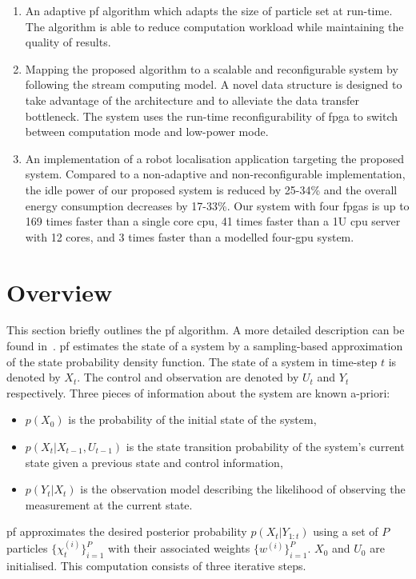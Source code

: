 \begin{enumerate}
\item An adaptive \gls{pf} algorithm which adapts the size of particle set at run-time. 
The algorithm is able to reduce computation workload while maintaining the quality of results.
\item Mapping the proposed algorithm to a scalable and reconfigurable system by following the stream computing model.
A novel data structure is designed to take advantage of the architecture and to alleviate the data transfer bottleneck.
The system uses the run-time reconfigurability of \gls{fpga} to switch between computation mode and low-power mode.
\item An implementation of a robot localisation application targeting the proposed system. 
Compared to a non-adaptive and non-reconfigurable implementation, the idle power of our proposed system is reduced by 25-34\% and the overall energy consumption decreases by 17-33\%.
Our system with four \gls{fpga}s is up to 169 times faster than a single core \gls{cpu}, 41 times faster than a 1U \gls{cpu} server with 12 cores, and 3 times faster than a modelled four-\gls{gpu} system.
\end{enumerate}

\section{Overview}

This section briefly outlines the \gls{pf} algorithm.
A more detailed description can be found in~\cite{doucet01}. 
\gls{pf} estimates the state of a system by a sampling-based approximation of the state probability density function. 
The state of a system in time-step $t$ is denoted by $X_t$. 
The control and observation are denoted by $U_t$ and $Y_t$ respectively. 
Three pieces of information about the system are known a-priori: 
\begin{itemize}
\item $p(X_0)$ is the probability of the initial state of the system, 
\item $p(X_t|X_{t-1},U_{t-1})$ is the state transition probability of the system's current state given a previous state and control information, 
\item $p(Y_t|X_t)$ is the observation model describing the likelihood of observing the measurement at the current state.
\end{itemize}

\gls{pf} approximates the desired posterior probability $p(X_{t}|Y_{1:t})$ using a set of $P$ particles $\{\chi^{(i)}_t\}^P_{i=1}$ with their associated weights $\{w^{(i)}\}^P_{i=1}$. 
$X_0$ and $U_0$ are initialised.
This computation consists of three iterative steps.

